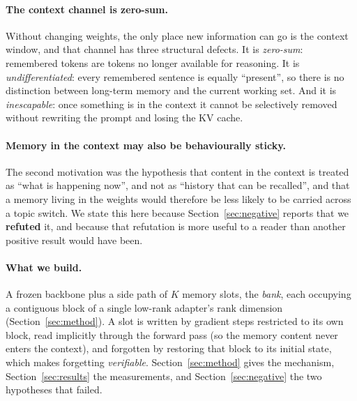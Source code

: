 \documentclass[11pt]{article}
\begin{document}
\paragraph{The context channel is zero-sum.} Without changing weights, the only
place new information can go is the context window, and that channel has three
structural defects. It is \emph{zero-sum}: remembered tokens are tokens no longer
available for reasoning. It is \emph{undifferentiated}: every remembered sentence
is equally ``present'', so there is no distinction between long-term memory and
the current working set. And it is \emph{inescapable}: once something is in the
context it cannot be selectively removed without rewriting the prompt and losing
the KV cache.

\paragraph{Memory in the context may also be behaviourally sticky.} The second
motivation was the hypothesis that content in the context is treated as ``what is
happening now'', and not as ``history that can be recalled'', and that a memory
living in the weights would therefore be less likely to be carried across a topic
switch. We state this here because Section~\ref{sec:negative} reports that we
\textbf{refuted} it, and because that refutation is more useful to a reader than
another positive result would have been.

\paragraph{What we build.} A frozen backbone plus a side path of $K$ memory slots, the
\emph{bank}, each occupying a contiguous block of a single low-rank adapter's rank dimension
(Section~\ref{sec:method}). A slot is written by gradient steps restricted to its own block,
read implicitly through the forward pass (so the memory content never enters the context),
and forgotten by restoring that block to its initial state, which makes forgetting
\emph{verifiable}. Section~\ref{sec:method} gives the mechanism, Section~\ref{sec:results}
the measurements, and Section~\ref{sec:negative} the two hypotheses that failed.
\end{document}
